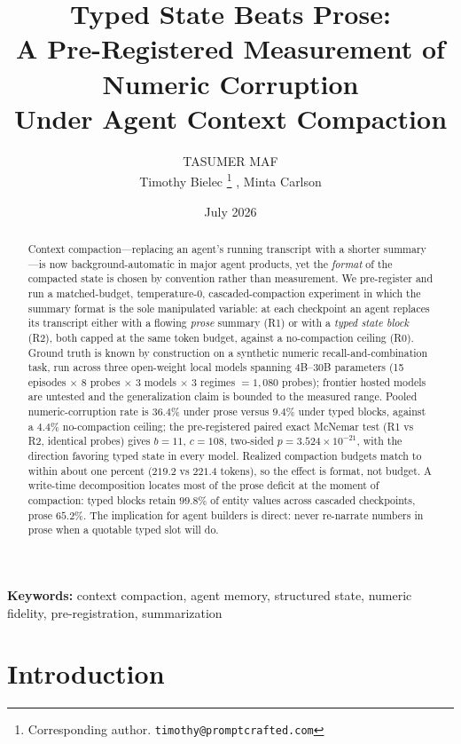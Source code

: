 \documentclass[11pt]{article}
\title{%
  Typed State Beats Prose:\\
  A Pre-Registered Measurement of Numeric Corruption\\
  Under Agent Context Compaction%
}
\author{%
  TASUMER MAF\\
  Timothy Bielec%
  \thanks{Corresponding author. \texttt{timothy@promptcrafted.com}}%
  , Minta Carlson
}
\date{July 2026}
\begin{document}
\maketitle

\begin{abstract}
Context compaction---replacing an agent's running transcript with a shorter
summary---is now background-automatic in major agent products, yet the
\emph{format} of the compacted state is chosen by convention rather than
measurement. We pre-register and run a matched-budget, temperature-0,
cascaded-compaction experiment in which the summary format is the sole
manipulated variable: at each checkpoint an agent replaces its transcript
either with a flowing \emph{prose} summary (R1) or with a \emph{typed state
block} (R2), both capped at the same token budget, against a no-compaction
ceiling (R0). Ground truth is known by construction on a synthetic numeric
recall-and-combination task, run across three open-weight local models
spanning $4$B--$30$B parameters (15 episodes $\times$ 8 probes $\times$ 3
models $\times$ 3 regimes $= 1{,}080$ probes); frontier hosted models are
untested and the generalization claim is bounded to the measured range.
Pooled numeric-corruption rate
is $36.4\%$ under prose versus $9.4\%$ under typed blocks, against a
$4.4\%$ no-compaction ceiling; the pre-registered paired exact McNemar test
(R1 vs R2, identical probes) gives $b=11$, $c=108$, two-sided
$p=3.524\times10^{-21}$, with the direction favoring typed state in every
model. Realized compaction budgets match to within about one percent
($219.2$ vs $221.4$ tokens), so the effect is format, not budget. A
write-time decomposition locates most of the prose deficit at the moment of
compaction: typed blocks retain $99.8\%$ of entity values across cascaded
checkpoints, prose $65.2\%$. The implication for agent builders is direct:
never re-narrate numbers in prose when a quotable typed slot will do.
\end{abstract}

\noindent\textbf{Keywords:} context compaction, agent memory, structured
state, numeric fidelity, pre-registration, summarization

\section{Introduction}
\label{sec:intro}
\end{document}
